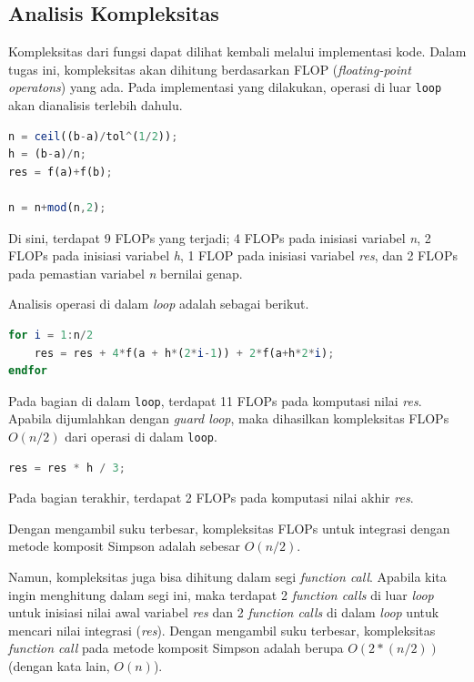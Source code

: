 \documentclass[journal,12pt,onecolumn,a4paper]{IEEEtran}
\begin{document}
\subsection{Analisis Kompleksitas}
Kompleksitas dari fungsi dapat dilihat kembali melalui implementasi kode. Dalam tugas ini, kompleksitas akan dihitung berdasarkan FLOP (\emph{floating-point operatons}) yang ada.
Pada implementasi yang dilakukan, operasi di luar \lstinline{loop} akan dianalisis terlebih dahulu.
\begin{center}
	\begin{lstlisting}[language=Octave]
n = ceil((b-a)/tol^(1/2));
h = (b-a)/n;
res = f(a)+f(b);
	  
n = n+mod(n,2);
	\end{lstlisting}
\end{center}

Di sini, terdapat 9 FLOPs yang terjadi; 4 FLOPs pada inisiasi variabel \emph{n}, 2 FLOPs pada inisiasi variabel \emph{h}, 1 FLOP pada inisiasi variabel \emph{res}, dan 2 FLOPs pada pemastian variabel \emph{n} bernilai genap.

Analisis operasi di dalam \emph{loop} adalah sebagai berikut.
\begin{center}
	\begin{lstlisting}[language=Octave]
for i = 1:n/2
	res = res + 4*f(a + h*(2*i-1)) + 2*f(a+h*2*i);
endfor
	\end{lstlisting}
\end{center}

\par Pada bagian di dalam \lstinline{loop}, terdapat 11 FLOPs pada komputasi nilai \emph{res}. Apabila dijumlahkan dengan \emph{guard loop}, maka dihasilkan kompleksitas FLOPs \(O(n/2)\) dari operasi di dalam \lstinline{loop}.

\begin{center}
	\begin{lstlisting}[language=Octave]
res = res * h / 3;
	\end{lstlisting}
\end{center}

Pada bagian terakhir, terdapat 2 FLOPs pada komputasi nilai akhir \emph{res}.

Dengan mengambil suku terbesar, kompleksitas FLOPs untuk integrasi dengan metode komposit Simpson adalah sebesar \(O(n/2)\).


Namun, kompleksitas juga bisa dihitung dalam segi \emph{function call}. Apabila kita ingin menghitung dalam segi ini, maka terdapat 2 \emph{function calls} di luar \emph{loop} untuk inisiasi nilai awal variabel \emph{res} dan 2 \emph{function calls} di dalam \emph{loop} untuk mencari nilai integrasi (\emph{res}). Dengan mengambil suku terbesar, kompleksitas \emph{function call} pada metode komposit Simpson adalah berupa \(O(2*(n/2))\) (dengan kata lain, \(O(n)\)).
\end{document}
